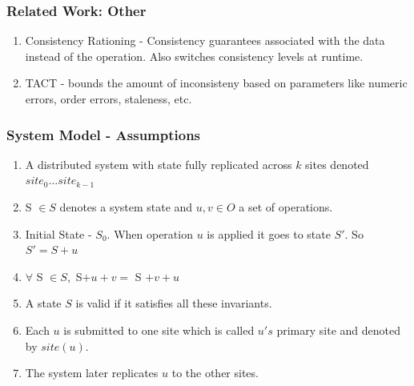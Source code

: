\documentclass{beamer}
\begin{document}

\begin{frame}
\frametitle{Related Work: Other}
\begin{enumerate}
\item Consistency Rationing - Consistency guarantees associated with the data instead of the operation. Also switches consistency levels at runtime.
\item TACT - bounds the amount of inconsisteny based on parameters like numeric errors, order errors, staleness, etc.
\end{enumerate}

\end{frame}



\begin{frame}
\frametitle{System Model - Assumptions}
\begin{enumerate}
\item A distributed system with state fully replicated across $k$ sites denoted $site_0 \ldots site_{k-1}$
\item S $\in S$ denotes a system state and $u,v \in O$ a set of operations. 
\item Initial State - $S_0$. When operation $u$ is applied it goes to state $S'$. So $S' = S + u$
\item $ \forall$ S $\in S,$ S$+u+v = $ S $+v+u$
\item A state $S$ is valid if it satisfies all these invariants.
\item Each $u$ is submitted to one site which is called $u's$ primary site and denoted by $site(u)$.
\item The system later replicates $u$ to the other sites.
\end{enumerate}

\end{frame}

\end{document}
